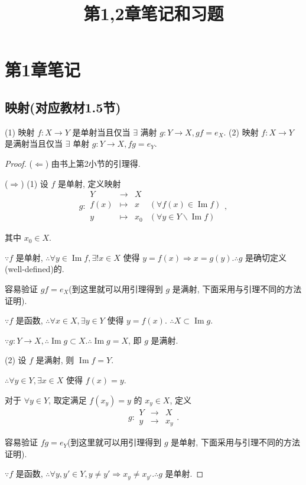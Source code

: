 \documentclass{ctexart}
\title{第1,2章笔记和习题}
\begin{document}
\maketitle
\section{第1章笔记}
\subsection{映射(对应教材1.5节)}
\begin{theorem}
    (1) 映射 $f:X\to Y$ 是单射当且仅当 $\exists$ 满射 $g:Y\to X,gf=e_X$. (2) 映射 $f:X\to Y$ 是满射当且仅当 $\exists$ 单射 $g:Y\to X,fg=e_Y$.
\end{theorem}
\begin{proof}
    ($\Leftarrow$) 由书上第2小节的引理得.
    
    ($\Rightarrow$) (1) 设 $f$ 是单射, 定义映射
    \[g:\begin{array}{rcll}
    Y & \to & X \\
    f(x) & \mapsto & x & (\forall f(x)\in\operatorname{Im}f) \\
    y & \mapsto & x_0 & (\forall y\in Y\backslash\operatorname{Im}f)
    \end{array},\]

    其中 $x_0\in X$.

    $\because f$ 是单射, $\therefore\forall y\in\operatorname{Im}f,\exists!x\in X$ 使得 $y=f(x)\Rightarrow x=g(y).\therefore g$ 是确切定义(well-defined)的.

    容易验证 $gf=e_X$(到这里就可以用引理得到 $g$ 是满射, 下面采用与引理不同的方法证明).

    $\because f$ 是函数, $\therefore\forall x\in X,\exists y\in Y$ 使得 $y=f(x)$. $\therefore X\subset\operatorname{Im}g$.

    $\because g:Y\to X,\therefore\operatorname{Im}g\subset X.\therefore\operatorname{Im}g=X$, 即 $g$ 是满射.

    (2) 设 $f$ 是满射, 则 $\operatorname{Im}f=Y$.

    $\therefore\forall y\in Y,\exists x\in X$ 使得 $f(x)=y$.

    对于 $\forall y\in Y$, 取定满足 $f(x_y)=y$ 的 $x_y\in X$, 定义
    \[g:\begin{array}{rcl}
    Y & \to & X \\
    y & \to & x_y
    \end{array}.\]

    容易验证 $fg=e_Y$(到这里就可以用引理得到 $g$ 是单射, 下面采用与引理不同的方法证明).

    $\because f$ 是函数, $\therefore\forall y,y'\in Y,y\neq y'\Rightarrow x_y\neq x_{y'}.\therefore g$ 是单射.
\end{proof}
\end{document}
